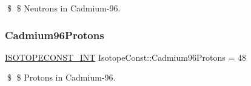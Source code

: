 \$ \$ Neutrons in Cadmium-\/96. \mbox{\label{group___isotope_const-_cadmium-_cd96_ga9882919b069d4c30cce9eb9a7bf963e5}} 
\subsubsection{\texorpdfstring{Cadmium96\+Protons}{Cadmium96Protons}}
{\footnotesize\ttfamily \mbox{\hyperlink{group___isotope_const-_macros_ga5f18360b3e99483a35c32d789e62621c}{I\+S\+O\+T\+O\+P\+E\+C\+O\+N\+S\+T\+\_\+\+I\+NT}} Isotope\+Const\+::\+Cadmium96\+Protons = 48}

\$ \$ Protons in Cadmium-\/96. 